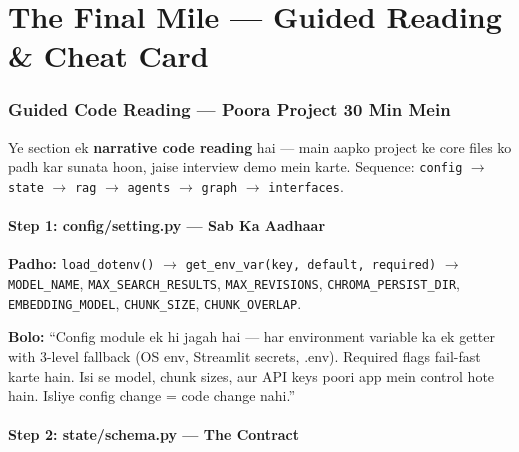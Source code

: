 \newpage

\part{The Final Mile --- Guided Reading \& Cheat Card}

\section{Guided Code Reading --- Poora Project 30 Min Mein}

\begin{storybox}
Ye section ek \textbf{narrative code reading} hai --- main aapko project ke core files ko padh kar sunata hoon, jaise interview demo mein karte. Sequence: \texttt{config} $\rightarrow$ \texttt{state} $\rightarrow$ \texttt{rag} $\rightarrow$ \texttt{agents} $\rightarrow$ \texttt{graph} $\rightarrow$ \texttt{interfaces}.
\end{storybox}

\subsection{Step 1: config/setting.py --- Sab Ka Aadhaar}

\begin{codestorybox}
\textbf{Padho:} \texttt{load\_dotenv()} $\rightarrow$ \texttt{get\_env\_var(key, default, required)} $\rightarrow$ \texttt{MODEL\_NAME}, \texttt{MAX\_SEARCH\_RESULTS}, \texttt{MAX\_REVISIONS}, \texttt{CHROMA\_PERSIST\_DIR}, \texttt{EMBEDDING\_MODEL}, \texttt{CHUNK\_SIZE}, \texttt{CHUNK\_OVERLAP}.

\textbf{Bolo:} ``Config module ek hi jagah hai --- har environment variable ka ek getter with 3-level fallback (OS env, Streamlit secrets, .env). Required flags fail-fast karte hain. Isi se model, chunk sizes, aur API keys poori app mein control hote hain. Isliye config change = code change nahi.''
\end{codestorybox}

\subsection{Step 2: state/schema.py --- The Contract}

